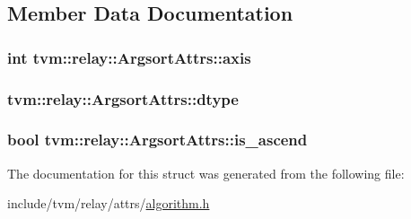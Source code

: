 \subsection{Member Data Documentation}
\subsubsection[{\texorpdfstring{axis}{axis}}]{\setlength{\rightskip}{0pt plus 5cm}int tvm\+::relay\+::\+Argsort\+Attrs\+::axis}\hypertarget{structtvm_1_1relay_1_1ArgsortAttrs_a3365bda570a8bec823e2b742ae32a924}{}\label{structtvm_1_1relay_1_1ArgsortAttrs_a3365bda570a8bec823e2b742ae32a924}
\subsubsection[{\texorpdfstring{dtype}{dtype}}]{ tvm\+::relay\+::\+Argsort\+Attrs\+::dtype}\hypertarget{structtvm_1_1relay_1_1ArgsortAttrs_a533842c9351d0ec7f8e2673e94987957}{}\label{structtvm_1_1relay_1_1ArgsortAttrs_a533842c9351d0ec7f8e2673e94987957}
\subsubsection[{\texorpdfstring{is\+\_\+ascend}{is_ascend}}]{\setlength{\rightskip}{0pt plus 5cm}bool tvm\+::relay\+::\+Argsort\+Attrs\+::is\+\_\+ascend}\hypertarget{structtvm_1_1relay_1_1ArgsortAttrs_a97f3acf400fafc612854c955a88673ea}{}\label{structtvm_1_1relay_1_1ArgsortAttrs_a97f3acf400fafc612854c955a88673ea}


The documentation for this struct was generated from the following file\+:\begin{DoxyCompactItemize}
\item 
include/tvm/relay/attrs/\hyperlink{algorithm_8h}{algorithm.\+h}\end{DoxyCompactItemize}
